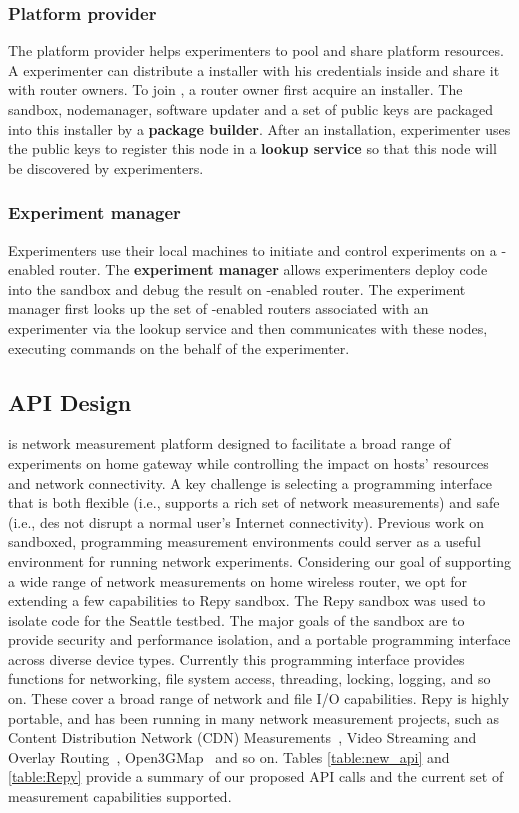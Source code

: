 \subsubsection{Platform provider}
The platform provider helps experimenters to pool and share platform resources. A experimenter can distribute a \sysname installer with his credentials inside and share it with router owners. To join \sysname, a router owner first acquire an \sysname installer. The sandbox, nodemanager, software updater and a set of public keys are packaged into this installer by a \textbf{package builder}. After an installation, experimenter uses the public keys to register this node in a \textbf{lookup service} so that this node will be discovered by experimenters.

\subsubsection{Experiment manager}
Experimenters use their local machines to initiate and control experiments on a \sysname-enabled router. The \textbf{experiment manager} allows experimenters deploy code into the sandbox and debug the result on \sysname-enabled router. The experiment manager first looks up the set of \sysname-enabled routers associated with an experimenter via the lookup service and then communicates with these nodes, executing commands on the behalf of the experimenter. 


\subsection{API Design}
\sysname is network measurement platform designed to facilitate a broad range of experiments on home gateway while controlling the impact on hosts' resources and network connectivity. A key challenge is selecting a programming interface that is both flexible (i.e., supports a rich set of network measurements) and safe (i.e., des not disrupt a normal user's Internet connectivity). Previous work on sandboxed, programming measurement environments \sysname could server as a useful environment for running network experiments. Considering our goal of supporting a wide range of network measurements on home wireless router, we opt for extending a few capabilities to Repy sandbox\cite{cappos2010retaining}. The Repy sandbox was used to isolate code for the Seattle testbed. The major goals of the sandbox are to provide security and performance isolation, and a portable programming interface across diverse device types. Currently this programming interface provides functions for networking, file system access, threading, locking, logging, and so on. These cover a broad range of network and file I/O capabilities. Repy is highly portable, and has been running in many network measurement projects, such as Content Distribution Network (CDN) Measurements~\cite{rafetseder2011exploring}, Video Streaming and Overlay Routing~\cite{eisl2011service}, Open3GMap~\cite{open3gmap} and so on. Tables \ref{table:new_api} and \ref{table:Repy} provide a summary of our proposed API calls and the current set of measurement capabilities \sysname supported. 

